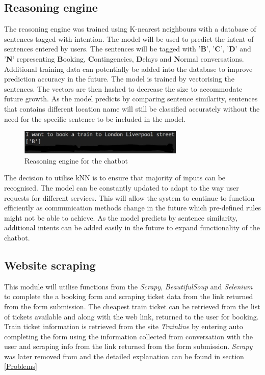 \documentclass[11pt]{article}
\begin{document}
\subsection{Reasoning engine}
The reasoning engine was trained using K-nearest neighbours with a database of sentences tagged with intention. The model will be used to predict the intent of sentences entered by users. The sentences will be tagged with '\textbf{B}', '\textbf{C}', '\textbf{D}' and '\textbf{N}' representing \textbf{B}ooking, \textbf{C}ontingencies, \textbf{D}elays and \textbf{N}ormal conversations. Additional training data can potentially be added into the database to improve prediction accuracy in the future. The model is trained by vectorising the sentences. The vectors are then hashed to decrease the size to accommodate future growth. As the model predicts by comparing sentence similarity, sentences that contains different location name will still be classified accurately without the need for the specific sentence to be included in the model.

\begin{figure}[!htb]
	\centering
	\includegraphics[width=0.7\textwidth]{Reasoning_Prototype}
	\caption{Reasoning engine for the chatbot }\label{fig:Reasoning_Prototype}
\end{figure}

The decision to utilise kNN is to ensure that majority of inputs can be recognised. The model can be constantly updated to adapt to the way user requests for different services. This will allow the system to continue to function efficiently as communication methods change in the future which pre-defined rules might not be able to achieve. As the model predicts by sentence similarity, additional intents can be added easily in the future to expand functionality of the chatbot.

\subsection{Website scraping}
This module will utilise functions from the \textit{Scrapy}, \textit{BeautifulSoup} and \textit{Selenium} to complete the a booking form and scraping ticket data from the link returned from the form submission. The cheapest train ticket can be retrieved from the list of tickets available and along with the web link, returned to the user for booking. Train ticket information is retrieved from the site \textit{Trainline} by entering auto completing the form using the information collected from conversation with the user and scraping info from the link returned from the form submission. \textit{Scrapy} was later removed from and the detailed explanation can be found in section \ref{Problems}
\end{document}

